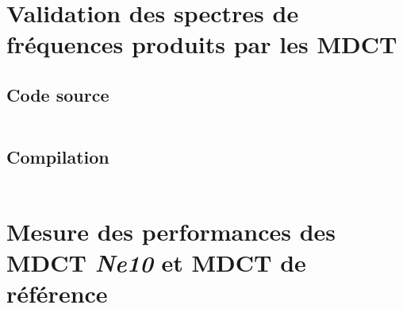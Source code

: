 \documentclass{article}
\begin{document}

\newpage
\section{Validation des spectres de fréquences produits par les MDCT}\label{app:spectrum_comparison}
\subsection{Code source}\label{app:spectrum_comparison_code}
\paragraph{}
\lstset{language=C++}
\begin{lstlisting}
\end{lstlisting}

\subsection{Compilation}\label{app:spectrum_comparison_cmake}
\paragraph{}
\lstset{language=make}
\begin{lstlisting}
\end{lstlisting}






\newpage
\section{Mesure des performances des MDCT \emph{Ne10} et MDCT de référence}\label{app:perf_mdct_ne10}
\end{document}
